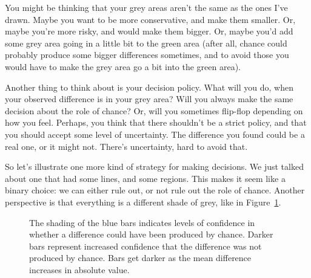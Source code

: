 \documentclass[
  letterpaper,
  DIV=11,
  numbers=noendperiod]{scrreprt}
\begin{document}
You might be thinking that your grey areas aren't the same as the ones
I've drawn. Maybe you want to be more conservative, and make them
smaller. Or, maybe you're more risky, and would make them bigger. Or,
maybe you'd add some grey area going in a little bit to the green area
(after all, chance could probably produce some bigger differences
sometimes, and to avoid those you would have to make the grey area go a
bit into the green area).

Another thing to think about is your decision policy. What will you do,
when your observed difference is in your grey area? Will you always make
the same decision about the role of chance? Or, will you sometimes
flip-flop depending on how you feel. Perhaps, you think that there
shouldn't be a strict policy, and that you should accept some level of
uncertainty. The difference you found could be a real one, or it might
not. There's uncertainty, hard to avoid that.

So let's illustrate one more kind of strategy for making decisions. We
just talked about one that had some lines, and some regions. This makes
it seem like a binary choice: we can either rule out, or not rule out
the role of chance. Another perspective is that everything is a
different shade of grey, like in Figure~\ref{fig-5crumpshade}.

\begin{figure}


\caption{\label{fig-5crumpshade}The shading of the blue bars indicates
levels of confidence in whether a difference could have been produced by
chance. Darker bars represent increased confidence that the difference
was not produced by chance. Bars get darker as the mean difference
increases in absolute value.}

\end{figure}%
\end{document}
